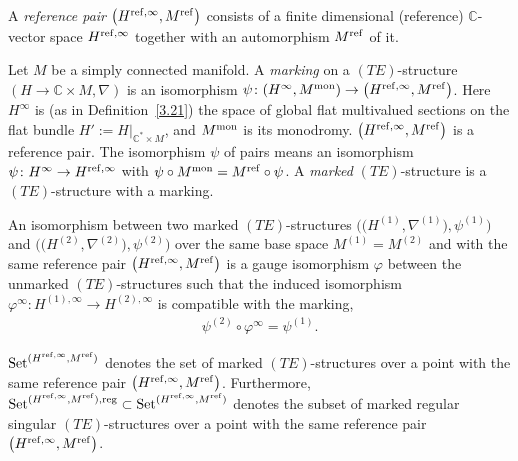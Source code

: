 \documentclass[pdftex]{sigma}%
\numberwithin{equation}{section}
\numberwithin{figure}{section}
\newcommand{\C}{{\mathbb C}}
\newcommand{\nnn}{\nabla}
\begin{document}
\begin{Definition}\label{t3.25}\quad
\begin{enumerate}\itemsep=0pt
\item[$(a)$] A {\it reference pair} $\big(H^{{\rm ref},\infty},M^{\rm ref}\big)$
consists of a finite dimensional (reference)
$\C$-vector space $H^{{\rm ref},\infty}$
together with an automorphism $M^{\rm ref}$ of it.

\item[$(b)$] Let $M$ be a simply connected manifold.
A {\it marking} on a $(TE)$-structure
$(H\to\C\times M,\nnn)$ is an isomorphism
$\psi\colon (H^{\infty},M^{\rm mon})\to \big(H^{{\rm ref},\infty},M^{\rm ref}\big)$.
Here $H^{\infty}$ is (as in Definition~\ref{3.21})
the space of global flat multivalued sections
on the flat bundle $H':=H|_{\C^*\times M}$,
and $M^{\rm mon}$ is its monodromy.
$\big(H^{{\rm ref},\infty},M^{\rm ref}\big)$ is a reference pair.
The isomorphism $\psi$ of pairs means an isomorphism
$\psi\colon H^{\infty}\to H^{{\rm ref},\infty}$
with $\psi\circ M^{\rm mon}=M^{\rm ref}\circ\psi$.
A {\it marked} $(TE)$-structure is a $(TE)$-structure
with a marking.


{\sloppy\item[$(c)$] An isomorphism between two marked $(TE)$-structures
$\big(\big(H^{(1)},\nnn^{(1)}\big),\psi^{(1)}\big)$ and
$\big(\big(H^{(2)},\nnn^{(2)}\big),\psi^{(2)}\big)$ over the same base space
$M^{(1)}=M^{(2)}$ and with the same reference pair
$\big(H^{{\rm ref},\infty},M^{\rm ref}\big)$ is a gauge isomorphism $\varphi$
between the unmarked $(TE)$-structures such that
the induced isomorphism
$\varphi^{\infty}\colon H^{(1),\infty}\to H^{(2),\infty}$
is compatible with the marking,
\begin{gather*}%
\psi^{(2)}\circ\varphi^{\infty}=\psi^{(1)}.
\end{gather*}

}

\item[$(d)$] ${\rm Set}^{(H^{{\rm ref},\infty},M^{\rm ref})}$ denotes the set of
marked $(TE)$-structures over a point with the same reference
pair $\big(H^{{\rm ref},\infty},M^{\rm ref}\big)$. Furthermore,
${\rm Set}^{(H^{{\rm ref},\infty},M^{\rm ref}),{\rm reg}}\subset
{\rm Set}^{(H^{{\rm ref},\infty},M^{\rm ref})}$
denotes the subset of marked regular singular
$(TE)$-structures over a point with the same reference pair
$\big(H^{{\rm ref},\infty},M^{\rm ref}\big)$.
\end{enumerate}
\end{Definition}
\end{document}
